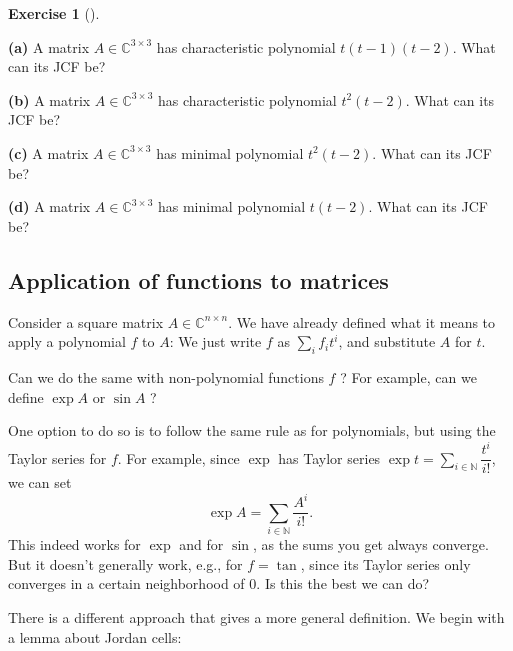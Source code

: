 \documentclass[numbers=enddot,12pt,final,onecolumn,notitlepage]{scrartcl}%
\newcounter{exer}
\numberwithin{exer}{subsection}
\theoremstyle{definition}
\newtheorem{exmp}[exer]{Exercise}
\newenvironment{exercise}[1][]
{\begin{exmp}[#1]\begin{leftbar}}
{\end{leftbar}\end{exmp}}
\let\sumnonlimits\sum
\renewcommand{\sum}{\sumnonlimits\limits}
\begin{document}
\begin{exercise}
 \textbf{(a)} A matrix $A\in\mathbb{C}^{3\times3}$ has characteristic
polynomial $t\left(  t-1\right)  \left(  t-2\right)  $. What can its JCF be?
\medskip

\textbf{(b)} A matrix $A\in\mathbb{C}^{3\times3}$ has characteristic
polynomial $t^{2}\left(  t-2\right)  $. What can its JCF be? \medskip

\textbf{(c)} A matrix $A\in\mathbb{C}^{3\times3}$ has minimal polynomial
$t^{2}\left(  t-2\right)  $. What can its JCF be? \medskip

\textbf{(d)} A matrix $A\in\mathbb{C}^{3\times3}$ has minimal polynomial
$t\left(  t-2\right)  $. What can its JCF be?
\end{exercise}

\subsection{Application of functions to matrices}

Consider a square matrix $A\in\mathbb{C}^{n\times n}$. We have already defined
what it means to apply a polynomial $f$ to $A$: We just write $f$ as $\sum
_{i}f_{i}t^{i}$, and substitute $A$ for $t$.

Can we do the same with non-polynomial functions $f$ ? For example, can we
define $\exp A$ or $\sin A$ ?

One option to do so is to follow the same rule as for polynomials, but using
the Taylor series for $f$. For example, since $\exp$ has Taylor series $\exp
t=\sum_{i\in\mathbb{N}}\dfrac{t^{i}}{i!}$, we can set%
\[
\exp A=\sum_{i\in\mathbb{N}}\dfrac{A^{i}}{i!}.
\]
This indeed works for $\exp$ and for $\sin$, as the sums you get always
converge. But it doesn't generally work, e.g., for $f=\tan$, since its Taylor
series only converges in a certain neighborhood of $0$. Is this the best we
can do?

There is a different approach that gives a more general definition. We begin
with a lemma about Jordan cells:
\end{document}
